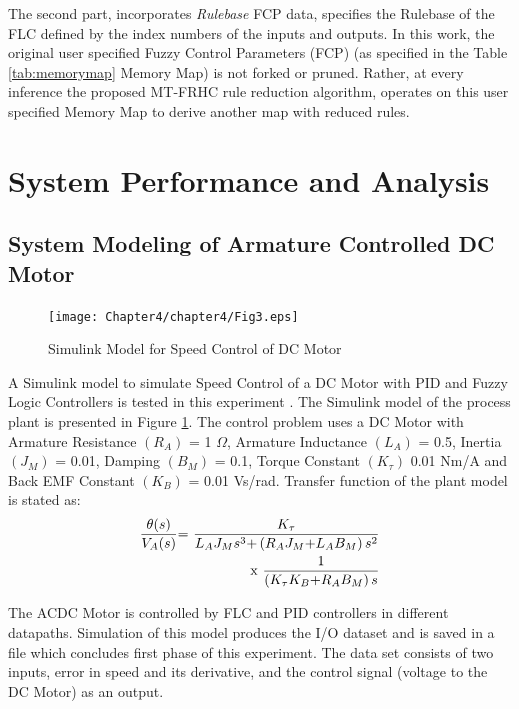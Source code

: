 The second part, incorporates \textit{Rulebase} FCP data, specifies the Rulebase of the FLC defined by the index numbers of the inputs and outputs.
In this work, the original user specified Fuzzy Control Parameters (FCP) (as specified in the Table \ref{tab:memorymap} Memory Map) is not forked or pruned. Rather, at every inference the proposed MT-FRHC rule reduction algorithm, operates on this user specified Memory Map to derive another map with reduced rules. 
 

\section{System Performance and Analysis}

\subsection{System Modeling of Armature Controlled DC Motor}
\begin{figure}[h!]
	\centering
	\texttt{[image: Chapter4/chapter4/Fig3.eps]}
	\caption{Simulink Model for Speed Control of DC Motor}
	\label{fig:SimulinkModelforSpeedControlofDCMotor}
\end{figure}

A Simulink model to simulate Speed Control of a DC Motor with PID and Fuzzy Logic Controllers is tested in this experiment \cite{malla2012,twotank2012}. The Simulink model of the process plant is presented in Figure \ref{fig:SimulinkModelforSpeedControlofDCMotor}. The control problem uses a DC Motor with Armature Resistance $ (R_A) $ = 1 $\Omega $, Armature Inductance $ (L_A) $ = 0.5, Inertia $ (J_M) $ = 0.01, Damping $ (B_M) $ = 0.1, Torque Constant $ (K_{\tau}) $  0.01 Nm/A and Back EMF Constant $ (K_B) $ = 0.01 Vs/rad. Transfer function of the plant model is stated as:
\begin{align} \label{eq:1}
\frac{\theta {\rm (}s{\rm )}}{V_A{\rm (}s{\rm )}}{\rm =\ } \frac{K_{\tau }}{L_AJ_Ms^{{\rm 3}}{\rm +}\left(R_AJ_M{\rm +}L_AB_M\right)s^{{\rm 2}}} \nonumber\\
{\rm x\ } \frac{1}{\left(K_{\tau }K_B{\rm +}R_AB_M\right)s}
\end{align}

The ACDC Motor is controlled by FLC and PID controllers in different datapaths. Simulation of this model produces the I/O dataset and is saved in a file which concludes first phase of this experiment. The data set consists of two inputs, error in speed and its derivative, and the control signal (voltage to the DC Motor) as an output.

